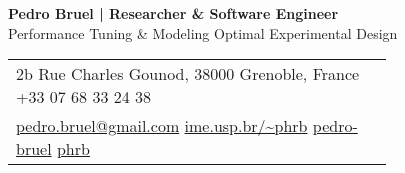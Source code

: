 \documentclass[10pt]{article}
\date{\today}
\title{}
\begin{document}
\parbox[top][0.12\textheight][c]{\linewidth}{ %
    \vspace{-0.08\textheight} %
    \centering %
    {\LARGE \textbf{Pedro Bruel | Researcher \& Software Engineer}}\\\medskip %
    {\Large Performance Tuning \& Modeling \textbullet{} Optimal Experimental Design}
}


\parbox[top][0.12\textheight][c]{\linewidth}{ %
    \vspace{-0.19\textheight} %
    \centering
    \colorbox{shade}{ %
        \begin{supertabular}{p{0.75\linewidth}} %
            \raisebox{-1pt}{\faHome} \hspace{0.15cm} 2b Rue Charles Gounod, 38000 Grenoble, France \hspace{0.2cm} \raisebox{-1pt}{\faPhone} \hspace{0.14cm} +33 07 68 33 24 38 \\ %
            \raisebox{0pt}{\small\faEnvelope} \hspace{0.2cm} \href{mailto:pedro.bruel@gmail.com}{pedro.bruel@gmail.com} \hspace{0.2cm} \raisebox{0pt}{\small\faDesktop} \hspace{0.2cm} \href{https://www.ime.usp.br/~phrb}{ime.usp.br/\textasciitilde{}phrb} \hspace{0.31cm} \raisebox{-1pt}{\faLinkedin} \hspace{0.2cm} \href{https://www.linkedin.com/in/pedro-bruel}{pedro-bruel} \hspace{0.2cm} \raisebox{-1pt}{\faGithub} \hspace{0.2cm} \href{https://github.com/phrb}{phrb} \\
        \end{supertabular}
    }
}
\end{document}
